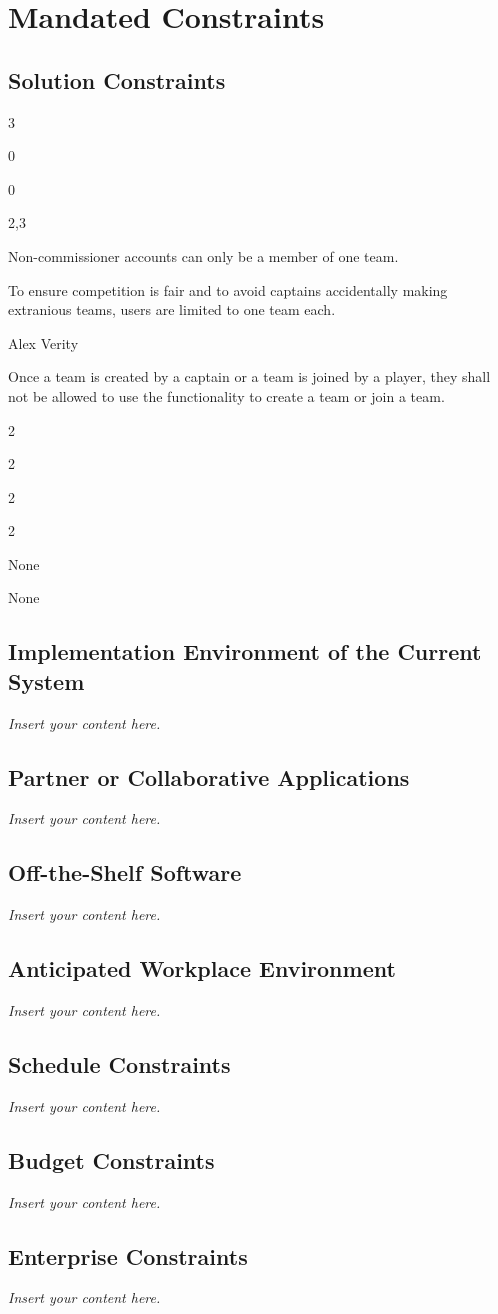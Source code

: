 \documentclass[12pt]{article}
\newenvironment{myreq}[1]{%
\setlist[description]{font=\normalfont\color{darkgray}}%
\begin{tcolorbox}[colframe=black,colback=white, sharp corners, boxrule=1pt]%
\bfseries\color{blue}%
\begin{description}#1}%
{\end{description}\end{tcolorbox}}
\newcommand{\threeinline}[3]{\begin{multicols}{3}#1 #2 #3\end{multicols}}
\newcommand{\twoinline}[2]{\begin{multicols}{2}#1 #2\end{multicols}}
\newcommand{\reqno}{\item[Requirement \#:]}
\newcommand{\reqtype}{\item[Requirement Type:]}
\newcommand{\reqevent}{\item[Event/BUC/PUC \#:]}
\newcommand{\reqdesc}{\item[Description:]}
\newcommand{\reqrat}{\item[Rationale:]}
\newcommand{\reqorig}{\item[Originator:]}
\newcommand{\reqfit}{\item[Fit Criterion:]}
\newcommand{\reqsatis}{\item[Customer Satisfaction:]}
\newcommand{\reqdissat}{\item[Customer Dissatisfaction:]}
\newcommand{\reqdep}{\item[Dependencies:]}
\newcommand{\reqconf}{\item[Conflicts:]}
\newcommand{\reqmater}{\item[Materials:]}
\newcommand{\reqhist}{\item[History:]}
\newcommand{\lips}{\textit{Insert your content here.}}
\begin{document}
\section{Mandated Constraints}
\subsection{Solution Constraints}

\begin{myreq}
  \threeinline
    {\reqno 0}
    {\reqtype 0}
    {\reqevent 2,3}
  \reqdesc Non-commissioner accounts can only be a member of one team.
  \reqrat To ensure competition is fair and to avoid captains accidentally
  making extranious teams, users are limited to one team each.
  \reqorig Alex Verity
  \reqfit Once a team is created by a captain or a team is joined by a player,
  they shall not be allowed to use the functionality to create a team or join
  a team.
  \twoinline
    {\reqsatis 2}
    {\reqdissat 2}
  \twoinline
  {\reqdep None}
  {\reqconf None}
  \reqmater
  \reqhist
\end{myreq}

\subsection{Implementation Environment of the Current System}
\lips
\subsection{Partner or Collaborative Applications}
\lips
\subsection{Off-the-Shelf Software}
\lips
\subsection{Anticipated Workplace Environment}
\lips
\subsection{Schedule Constraints}
\lips
\subsection{Budget Constraints}
\lips
\subsection{Enterprise Constraints}
\lips
\end{document}
